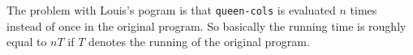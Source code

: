 \documentclass[a4paper,12pt]{article}
\begin{document}
The problem with Louis's pogram is that \lstinline!queen-cols! is
evaluated $n$ times instead of once in the original program.  So
basically the running time is roughly equal to $n  T$ if $T$ denotes
the running of the original program.
\end{document}
